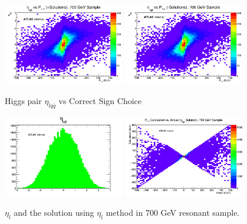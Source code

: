 \begin{figure}[!h]
\begin{center}
	\includegraphics[width=0.47\textwidth]{figures/nupz/etalqqplus.png}
	\includegraphics[width=0.47\textwidth]{figures/nupz/etalqqminus.png}
	\caption{Higgs pair $\eta_{l q \bar{q}}$ vs Correct Sign Choice}
	\label{fig:etalqqplots}
\end{center}
\end{figure}

\begin{figure}[!h]
\begin{center}
\includegraphics*[width=0.47\textwidth] {figures/nupz/etalqqdist.png}
\includegraphics*[width=0.47\textwidth] {figures/nupz/eta-lqq700.png}
	\caption{$\eta_{l}$ and the solution using $\eta_{l}$ method in 700 GeV resonant sample.}
\label{fig:etaplots}
\end{center}
\end{figure}

